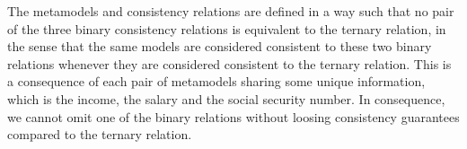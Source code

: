 The metamodels and consistency relations are defined in a way such that no pair of the three binary consistency relations is equivalent to the ternary relation, in the sense that the same models are considered consistent to these two binary relations whenever they are considered consistent to the ternary relation.
This is a consequence of each pair of metamodels sharing some unique information, which is the income, the salary and the social security number.
In consequence, we cannot omit one of the binary relations without loosing consistency guarantees compared to the ternary relation.



    

